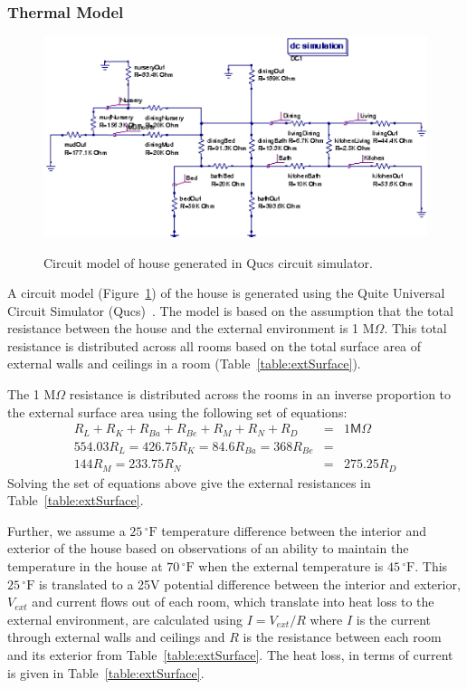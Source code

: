\subsubsection{Thermal Model}

\begin{figure}[!htb]
  \centering
  \includegraphics[width=0.8\columnwidth]{fig/houseCircuit}
  \label{fig:houseCircuit}
  \caption{Circuit model of house generated in Qucs circuit simulator.}
\end{figure}

A circuit model (Figure~\ref{fig:houseCircuit}) of the house is generated using
the Quite Universal Circuit Simulator (Qucs)~\cite{qucs}. The model is based on
the assumption that the total resistance between the house and the external
environment is 1 M$\Omega$. This total resistance is distributed across all
rooms based on the total surface area of external walls and ceilings in a room
(Table~\ref{table:extSurface}).

The 1 M$\Omega$ resistance is distributed across the rooms in an inverse
proportion to the external surface area using the following set of equations:
\begin{eqnarray*}
R_L + R_K + R_{Ba} + R_{Be} + R_M + R_N + R_D &=& 1 \mathsf{M}\Omega \\
554.03R_L = 426.75R_K = 84.6R_{Ba} = 368R_{Be} &=& \\144R_M = 233.75R_N &=&
275.25R_D
\end{eqnarray*}
Solving the set of equations above give the external resistances in
Table~\ref{table:extSurface}. 

Further, we assume a $25\,^{\circ}\mathrm{F}$ temperature difference between the interior
and exterior of the house based on observations of an ability to maintain the
temperature in the house at $70\,^{\circ}\mathrm{F}$ when the external temperature is
$45\,^{\circ}\mathrm{F}$. This $25\,^{\circ}\mathrm{F}$ is translated to a 25V potential difference
between the interior and exterior, $V_{ext}$ and current flows out of each room,
which translate into heat loss to the external environment, are calculated using
$I = V_{ext}/R$ where $I$ is the current through external walls and ceilings and
$R$ is the resistance between each room and its exterior from
Table~\ref{table:extSurface}. The heat loss, in terms of current is given in
Table~\ref{table:extSurface}.


